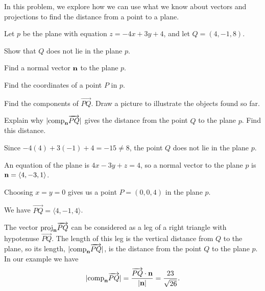 \begin{exercises}
\item \label{Ez:9.5.4}   In this problem, we explore how we can use what we know about vectors and projections to find the distance from a point to a
plane.

Let $p$ be the plane with equation $z=-4x+3y+4$, and let 
$Q = (4,-1,8)$.

	\ba
	\item Show that $Q$ does not lie in the plane $p$.
	\item Find a normal vector $\mathbf{n}$ to the plane $p$.
	\item Find the coordinates of a point $P$ in $p$.
	\item Find the components of $\overrightarrow{PQ}$. Draw a picture to illustrate the objects found so far.
	\item Explain why $|\text{comp}_{\mathbf{n}} \overrightarrow{PQ}|$ gives the distance from the point $Q$ to the plane $p$. Find this distance.
	\ea

\begin{exerciseSolution}
	\ba
	\item Since $-4(4) + 3(-1) + 4 = -15 \neq 8$, the point $Q$ does not lie in the plane $p$.
	\item An equation of the plane is $4x-3y+z = 4$, so a normal vector to the plane $p$ is $\mathbf{n} = \langle 4, -3, 1 \rangle$. 
	\item Choosing $x=y=0$ gives us a point $P = (0,0,4)$ in the plane $p$. 
	\item We have $\overrightarrow{PQ} = \langle 4, -1, 4 \rangle$. 
	\item The vector $\text{proj}_{\mathbf{n}} \overrightarrow{PQ}$ can be considered as a leg of a right triangle with hypotenuse $\overrightarrow{PQ}$. The length of this leg is the vertical distance from $Q$ to the plane, so its length, $|\text{comp}_{\mathbf{n}} \overrightarrow{PQ}|$, is the distance from the point $Q$ to the plane $p$. In our example we have
\[|\text{comp}_{\mathbf{n}} \overrightarrow{PQ}| = \frac{\overrightarrow{PQ} \cdot \mathbf{n}}{|\mathbf{n}|} = \frac{23}{\sqrt{26}}.\]
	\ea
\end{exerciseSolution}


\end{exercises}
\afterexercises
